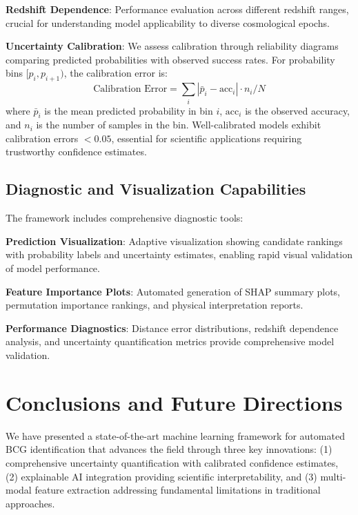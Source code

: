 \documentclass[twocolumn,10pt]{aastex631}
\begin{document}
\textbf{Redshift Dependence}: Performance evaluation across different redshift ranges, crucial for understanding model applicability to diverse cosmological epochs.

\textbf{Uncertainty Calibration}: We assess calibration through reliability diagrams comparing predicted probabilities with observed success rates. For probability bins $[p_i, p_{i+1})$, the calibration error is:
\begin{equation}
\text{Calibration Error} = \sum_{i} |\bar{p}_i - \text{acc}_i| \cdot n_i / N
\end{equation}
where $\bar{p}_i$ is the mean predicted probability in bin $i$, $\text{acc}_i$ is the observed accuracy, and $n_i$ is the number of samples in the bin. Well-calibrated models exhibit calibration errors $< 0.05$, essential for scientific applications requiring trustworthy confidence estimates.

\subsection{Diagnostic and Visualization Capabilities}

The framework includes comprehensive diagnostic tools:

\textbf{Prediction Visualization}: Adaptive visualization showing candidate rankings with probability labels and uncertainty estimates, enabling rapid visual validation of model performance.

\textbf{Feature Importance Plots}: Automated generation of SHAP summary plots, permutation importance rankings, and physical interpretation reports.

\textbf{Performance Diagnostics}: Distance error distributions, redshift dependence analysis, and uncertainty quantification metrics provide comprehensive model validation.

\section{Conclusions and Future Directions}

We have presented a state-of-the-art machine learning framework for automated BCG identification that advances the field through three key innovations: (1) comprehensive uncertainty quantification with calibrated confidence estimates, (2) explainable AI integration providing scientific interpretability, and (3) multi-modal feature extraction addressing fundamental limitations in traditional approaches.
\end{document}
